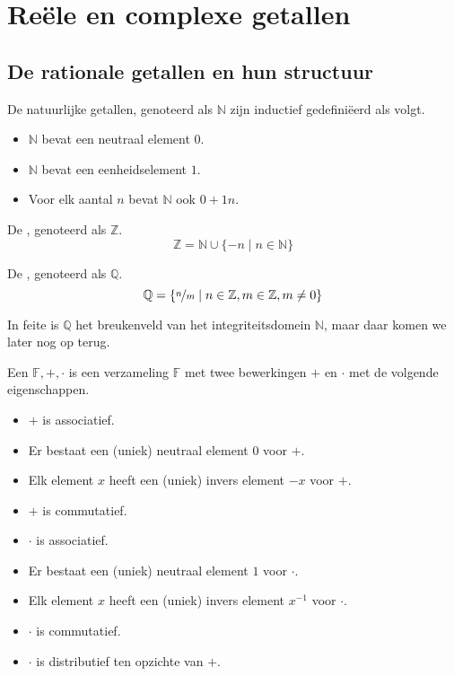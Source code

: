 \documentclass[main.tex]{subfiles}
\begin{document}
\chapter{Re\"ele en complexe getallen}
\label{cha:reele-en-complexe-getallen}

\section{De rationale getallen en hun structuur}
\label{sec:de-rati-getall}

\begin{de}
  De natuurlijke getallen, genoteerd als $\mathbb{N}$ zijn inductief gedefini\"eerd als volgt.
  \begin{itemize}
  \item $\mathbb{N}$ bevat een neutraal element $0$.
  \item $\mathbb{N}$ bevat een eenheidselement $1$.
  \item Voor elk aantal $n$ bevat $\mathbb{N}$ ook $0+1n$.
  \end{itemize}
\end{de}

\begin{de}
  De , genoteerd als $\mathbb{Z}$.
  \[ \mathbb{Z} = \mathbb{N} \cup \{ -n \mid n\in \mathbb{N} \}  \]
\end{de}

\begin{de}
  De , genoteerd als $\mathbb{Q}$.
  \[ \mathbb{Q} = \{ \nicefrac{n}{m} \mid n\in \mathbb{Z}, m\in \mathbb{Z}, m \neq 0 \} \]
\end{de}

\begin{opm}
  In feite is $\mathbb{Q}$ het breukenveld van het integriteitsdomein $\mathbb{N}$, maar daar komen we later nog op terug.   
\end{opm}

\begin{de}
  Een  $\mathbb{F},+,\cdot$ is een verzameling $\mathbb{F}$ met twee bewerkingen $+$ en $\cdot$ met de volgende eigenschappen.
  \begin{itemize}
  \item $+$ is associatief.
  \item Er bestaat een (uniek) neutraal element $0$ voor $+$.
  \item Elk element $x$ heeft een (uniek) invers element $-x$ voor $+$.
  \item $+$ is commutatief.
  \item $\cdot$ is associatief.
  \item Er bestaat een (uniek) neutraal element $1$ voor $\cdot$.
  \item Elk element $x$ heeft een (uniek) invers element $x^{-1}$ voor $\cdot$.
  \item $\cdot$ is commutatief.
  \item $\cdot$ is distributief ten opzichte van $+$.
  \end{itemize}
\end{de}
\end{document}
